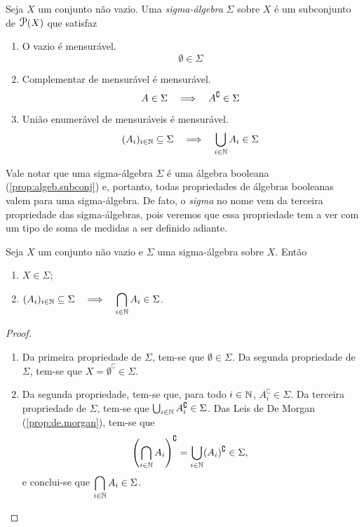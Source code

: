 \begin{defi}
	Seja $X$ um conjunto não vazio. Uma \emph{sigma-álgebra} $\Sigma$ sobre $X$ é um subconjunto de $\p(X)$ que satisfaz
	\begin{enumerate}
	\item O vazio é mensurável.
	\begin{equation*}
	\emptyset \in \Sigma
	\end{equation*}

	\item Complementar de mensurável é mensurável.
	\begin{equation*}
	A \in \Sigma \quad \Longrightarrow \quad A^\complement \in \Sigma
	\end{equation*}
	\item União enumerável de mensuráveis é mensurável.
	\begin{equation*}
	(A_i)_{i \in \mathbb{N}} \subseteq \Sigma \quad \Longrightarrow \quad \bigcup_{i \in \mathbb{N}} A_i \in \Sigma
	\end{equation*}
	\end{enumerate}
\end{defi}

	Vale notar que uma sigma-álgebra $\Sigma$ é uma álgebra booleana (\ref{prop:algeb.subconj}) e, portanto, todas propriedades de álgebras booleanas valem para uma sigma-álgebra. De fato, o \textit{sigma} no nome vem da terceira propriedade das sigma-álgebras, pois veremos que essa propriedade tem a ver com um tipo de soma de medidas a ser definido adiante.

\begin{prop}
	Seja $X$ um conjunto não vazio e $\Sigma$ uma sigma-álgebra sobre $X$. Então
	\begin{enumerate}
	\item $X \in \Sigma$;
	\item $(A_i)_{i \in \mathbb{N}} \subseteq \Sigma \quad \Longrightarrow \quad \displaystyle \bigcap_{i \in \mathbb{N}} A_i \in \Sigma$.
	\end{enumerate}
\end{prop}
\begin{proof}
	\begin{enumerate}
	\item Da primeira propriedade de $\Sigma$, tem-se que $\emptyset \in \Sigma$. Da segunda propriedade de $\Sigma$, tem-se que $X = \emptyset^\complement \in \Sigma$.
	\item Da segunda propriedade, tem-se que, para todo $i \in \mathbb{N}$, $A_i^\complement \in \Sigma$. Da terceira propriedade de $\Sigma$, tem-se que $\bigcup_{i \in \mathbb{N}} A_i^\complement \in \Sigma$. Das Leis de De Morgan (\ref{prop:de.morgan}), tem-se que
	\begin{equation*}
	\left(\bigcap_{i \in \mathbb{N}} A_i \right)^\complement = \bigcup_{i \in \mathbb{N}} (A_i)^\complement \in \Sigma,
	\end{equation*}
e conclui-se que $\displaystyle\bigcap_{i \in \mathbb{N}} A_i \in \Sigma$.
	\end{enumerate}
\end{proof}

